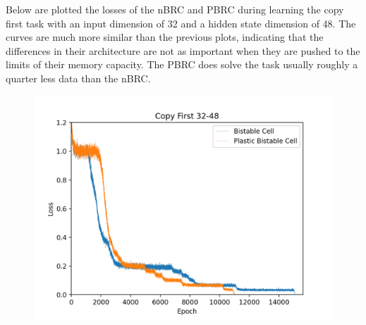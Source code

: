 Below are plotted the losses of the nBRC and PBRC during learning the copy first task with an input dimension of 32 and a hidden state dimension of 48. The curves are much more similar than the previous plots, indicating that the differences in their architecture are not as important when they are pushed to the limits of their memory capacity. The PBRC does solve the task usually roughly a quarter less data than the nBRC.
\begin{figure}[h]
	\centering
	\includegraphics[width=5in]{plots/32_48_plot}
\end{figure}